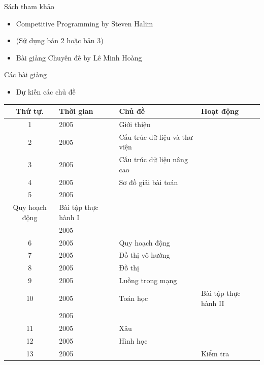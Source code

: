 \documentclass{beamer}
\newcommand{\bi}{\begin{itemize}}
\newcommand{\ei}{\end{itemize}}
\begin{document}
\begin{frame}{Sách tham khảo}
    \vspace{20pt}

    \bi
        \item {\color{hilight}Competitive Programming} by Steven Halim
        \item[] (Sử dụng bản 2 hoặc bản 3)
        \vspace{10pt}
        \item {\color{hilight}Bài giảng Chuyên đề} by Lê Minh Hoàng
    \ei
\end{frame}

\begin{frame}{Các bài giảng}
    \bi
        \item Dự kiến các chủ đề
    \ei

    {
        \tiny

        \begin{center}
            \begin{tabular}{cl|ll}
                Thứ tự. & Thời gian & Chủ đề & Hoạt động \\
                \hline
                1 & 2005 & Giới thiệu & \\
                2 & 2005 & Cấu trúc dữ liệu và thư viện & \\
                3 & 2005 & Cấu trúc dữ liệu nâng cao & \\
                4 & 2005 & Sơ đồ giải bài toán & \\
                5 & 2005 &\pbox{20cm}{\vspace{2pt}Tham lam \\Quy hoạch động} & Bài tập thực hành I \\
                  & 2005 & & \\
                6 & 2005 & Quy hoạch động & \\
                7 & 2005 & Đồ thị vô hướng & \\
                8 & 2005 & Đồ thị & \\
                9 & 2005 & Luồng trong mạng & \\
                10 & 2005 & Toán học & Bài tập thực hành II \\
                   & 2005 & & \\
                11 & 2005 & Xâu & \\
                12 & 2005 & Hình học & \\
                13 & 2005 & & Kiểm tra \\
            \end{tabular}
        \end{center}
    }
    
\end{frame}
\end{document}
